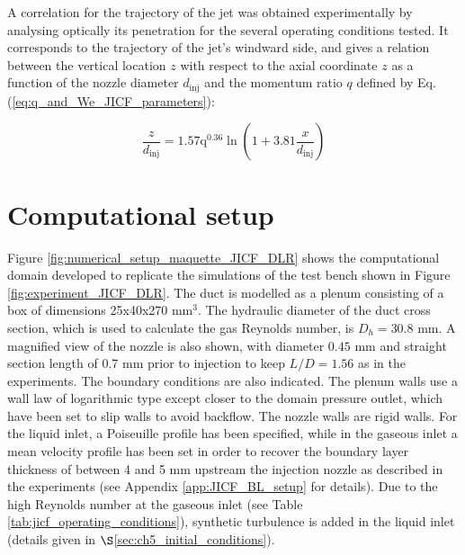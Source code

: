 A correlation for the trajectory of the jet was obtained experimentally by analysing optically its penetration for the several operating conditions tested. It corresponds to the trajectory of the jet's windward side, and gives a relation between the vertical location $z$ with respect to the axial coordinate $z$ as a function of the nozzle diameter $d_\mathrm{inj}$ and the momentum ratio $q$ defined by Eq. (\ref{eq:q_and_We_JICF_parameters}): %

\begin{equation}
    \label{eq:jicf_trajectory_becker}
    \frac{z}{d_\mathrm{inj}} = 1.57 \mathrm{q}^{0.36} \ln \left( 1 + 3.81 \frac{x}{d_\mathrm{inj}} \right)
\end{equation}



\section{Computational setup}
	\label{sec:computational_setup}


Figure \ref{fig:numerical_setup_maquette_JICF_DLR} shows the computational domain developed to replicate the simulations of the test bench shown in Figure \ref{fig:experiment_JICF_DLR}. The duct is modelled as a plenum consisting of a box of dimensions 25x40x270 mm$^3$. The hydraulic diameter of the duct cross section, which is used to calculate the gas Reynolds number, is $D_h = 30.8$ mm. A magnified view of the nozzle is also shown, with diameter $0.45$ mm and straight section length of 0.7 mm prior to injection to keep $L/D = 1.56$ as in the experiments. The boundary conditions are also indicated. The plenum walls use a wall law of logarithmic type except closer to the domain pressure outlet, which have been set to slip walls to avoid backflow. The nozzle walls are rigid walls. For the liquid inlet, a Poiseuille profile has been specified, while in the gaseous inlet a mean velocity profile has been set in order to recover the boundary layer thickness of between 4 and 5 mm upstream the injection nozzle as described in the experiments (see Appendix \ref{app:JICF_BL_setup} for details). Due to the high Reynolds number at the gaseous inlet (see Table \ref{tab:jicf_operating_conditions}), synthetic turbulence is added in the liquid inlet (details given in $\S$\ref{sec:ch5_initial_conditions}).

